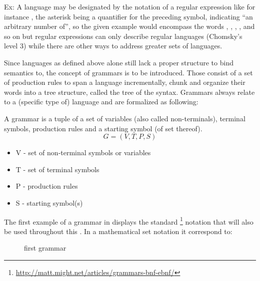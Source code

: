Ex: A language may be designated by the notation of a regular expression like for instance , the asterisk being a quantifier for the preceding symbol, indicating ``an arbitrary number of'', so the given example would encompass the words , , , ,  and so on but regular expressions can only describe regular languages (Chomsky's level 3) while there are other ways to address greater sets of languages.

Since languages as defined above alone still lack a proper structure to bind semantics to, the concept of grammars is to be introduced. Those consist of a set of production rules to span a language incrementally, chunk and organize their words into a tree structure, called the tree of the syntax. Grammars always relate to a (specific type of) language and are formalized as following:

\begin{definition}
	A grammar is a tuple of a set of variables (also called non-terminals), terminal symbols, production rules and a starting symbol (of set thereof).
	\[G = (V, T, P, S)\]
	
	\begin{itemize}
	\item	V - set of non-terminal symbols or variables
	\item	T - set of terminal symbols
	\item	P - production rules
	\item	S - starting symbol(s)
	\end{itemize}
\end{definition}

\FloatBarrier

The first example of a grammar in  displays the standard \footnote{\url{http://matt.might.net/articles/grammars-bnf-ebnf/}} notation that will also be used throughout this \paper{}. In a mathematical set notation it correspond to:

\begin{figure}
	\centering
	
	

	\caption{first grammar}
	\label{fig:grammar_example_first}
\end{figure}

